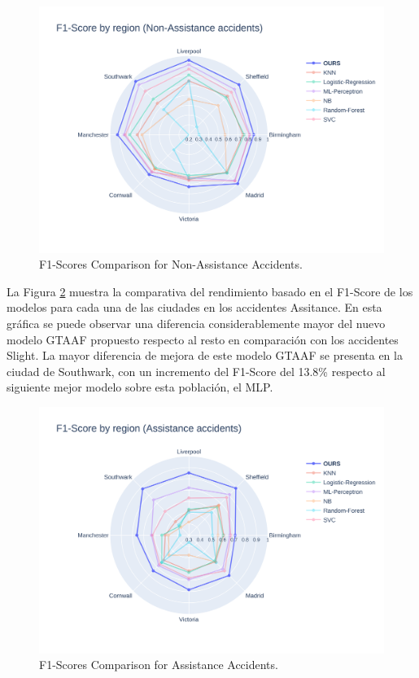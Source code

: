 \documentclass{uathesis-es}
\begin{document}
{\begin{figure}[H]
    \centering
    \includegraphics[width=150mm]{Figures/Slight.png}
    \caption{F1-Scores Comparison for Non-Assistance Accidents.}
    \label{GlobalSlightF1Score}
\end{figure}

La Figura \ref{GlobalAssistanceF1Score} muestra la comparativa del rendimiento basado en el F1-Score de los modelos para cada una de las ciudades en los accidentes Assitance. En esta gráfica se puede observar una diferencia considerablemente mayor del nuevo modelo GTAAF propuesto respecto al resto en comparación con los accidentes Slight. La mayor diferencia de mejora de este modelo GTAAF se presenta en la ciudad de Southwark, con un incremento del F1-Score del 13.8\% respecto al siguiente mejor modelo sobre esta población, el MLP.

\begin{figure}[H]
    \centering
    \includegraphics[width=150mm]{Figures/Assistance.png}
    \caption{F1-Scores Comparison for Assistance Accidents.}
    \label{GlobalAssistanceF1Score}
\end{figure}

}
\end{document}
